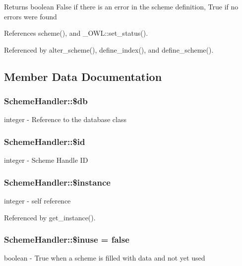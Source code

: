 \begin{DoxyReturn}{Returns}
boolean False if there is an error in the scheme definition, True if no errors were found 
\end{DoxyReturn}


References scheme(), and \_\-OWL::set\_\-status().



Referenced by alter\_\-scheme(), define\_\-index(), and define\_\-scheme().



\subsection{Member Data Documentation}
\subsubsection[{\$db}]{\setlength{\rightskip}{0pt plus 5cm}SchemeHandler::\$db}\label{classSchemeHandler_abf3bf26e35b759ccd49f358dedc2dfd1}
integer -\/ Reference to the database class 
\subsubsection[{\$id}]{\setlength{\rightskip}{0pt plus 5cm}SchemeHandler::\$id}\label{classSchemeHandler_af297e966eae06ff1e38a143f93b4aeb9}
integer -\/ Scheme Handle ID 
\subsubsection[{\$instance}]{\setlength{\rightskip}{0pt plus 5cm}SchemeHandler::\$instance}\label{classSchemeHandler_a6f45c52527230b3f3b60d75a9b55e3c1}
integer -\/ self reference 

Referenced by get\_\-instance().

\subsubsection[{\$inuse}]{\setlength{\rightskip}{0pt plus 5cm}SchemeHandler::\$inuse = false}\label{classSchemeHandler_a90e5b04603f86c04b1691b2ddf730104}
boolean -\/ True when a scheme is filled with data and not yet used 

